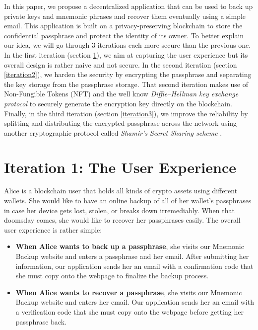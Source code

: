 \documentclass[runningheads]{llncs}
\begin{document}
In this paper, we propose a decentralized application that can be used to back up private keys and mnemonic phrases and recover them eventually using a simple email. This application is built on a privacy-preserving blockchain \cite{zyskind2015decentralizing} to store the confidential passphrase and protect the identity of its owner. To better explain our idea, we will go through 3 iterations each more secure than the previous one. In the first iteration (section \ref{iteration1}), we aim at capturing the user experience but its overall design is rather naive and not secure. In the second iteration (section \ref{iteration2}), we harden the security by encrypting the passphrase and separating the key storage from the passphrase storage. That second iteration makes use of Non-Fungible Tokens (NFT) \cite{wang2021non} and the well know {\em Diffie–Hellman key exchange protocol} \cite{diffie2022new} to securely generate the encryption key directly on the blockchain. Finally, in the third iteration (section \ref{iteration3}), we improve the reliability by splitting and distributing the encrypted passphrase across the network using another cryptographic protocol called {\em Shamir's Secret Sharing scheme} \cite{shamir1979share}. 

\section{Iteration 1: The User Experience}
\label{iteration1}

Alice is a blockchain user that holds all kinds of crypto assets using different wallets. She would like to have an online backup of all of her wallet's passphrases in case her device gets lost, stolen, or breaks down irremediably. When that doomsday comes, she would like to recover her passphrases easily. The overall user experience is rather simple: 

\begin{itemize}
    \item {\bf When Alice wants to back up a passphrase}, she visits our Mnemonic Backup website and enters a passphrase and her email. After submitting her information, our application sends her an email with a confirmation code that she must copy onto the webpage to finalize the backup process. 
    \item {\bf When Alice wants to recover a passphrase}, she visits our Mnemonic Backup website and enters her email. Our application sends her an email with a verification code that she must copy onto the webpage before getting her passphrase back. 
\end{itemize}
\end{document}
